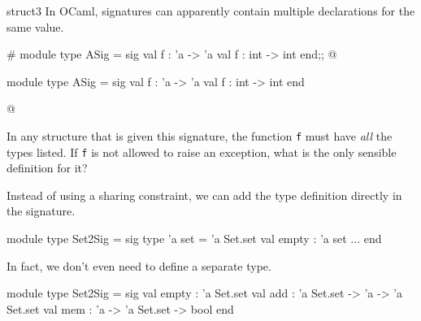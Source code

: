 \begin{exercise}{struct3}
In OCaml, signatures can apparently contain multiple declarations for the same value.

\begin{ocaml}
# module type ASig = sig
   val f : 'a -> 'a
   val f : int -> int
  end;;
@
\begin{topoutput}
module type ASig = sig val f : 'a -> 'a val f : int -> int end
\end{topoutput}
@
\end{ocaml}
%
In any structure that is given this signature, the
function \hbox{\lstinline$f$} must have \emph{all} the types listed.
If \hbox{\lstinline$f$} is not allowed to raise an exception, what is
the only sensible definition for it?

\begin{answer}\ifanswers
Instead of using a sharing constraint, we can add the type definition
directly in the signature.

\begin{ocaml}
module type Set2Sig = sig
   type 'a set = 'a Set.set
   val empty : 'a set
   ...
end
\end{ocaml}
%
In fact, we don't even need to define a separate type.

\begin{ocaml}
module type Set2Sig = sig
   val empty : 'a Set.set
   val add : 'a Set.set -> 'a -> 'a Set.set
   val mem : 'a -> 'a Set.set -> bool
end
\end{ocaml}
\fi\end{answer}
\end{exercise}

